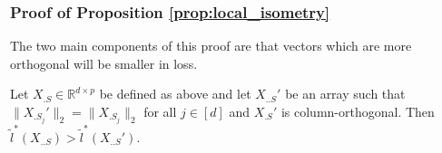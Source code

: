 \subsubsection{Proof of Proposition \ref{prop:local_isometry}}
\label{sec:local_isometry_proof}

The two main components of this proof are that vectors which are more orthogonal will be smaller in loss.

\begin{proposition}
\label{lemma:orthogonal}
Let $X_{.S} \in \mathbb R^{d \times p}$ be defined as above and let $X_{..S}'$ be an array such that $\|X_{.S_j}'\|_2 = \|X_{.S_j}\|_2$ for all $j \in [d]$ and $X_{.S}'$ is column-orthogonal.
Then $\tilde l^* (X_{..S}) > \tilde l^* (X_{..S}')$.
\end{proposition}
